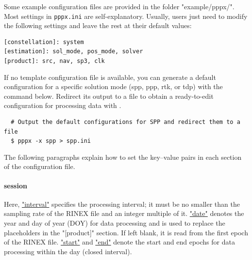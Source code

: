 Some example configuration files are provided in the folder "example/pppx/".
Most settings in \texttt{pppx.ini} are self-explanatory.
Usually, users just need to modify the following settings
and leave the rest at their default values:

\begin{verbatim}
[constellation]: system
[estimation]: sol_mode, pos_mode, solver
[product]: src, nav, sp3, clk
\end{verbatim}

If no template configuration file is available, you can generate a default configuration for a
specific solution mode (spp, ppp, rtk, or tdp) with the command below.
Redirect its output to a file to obtain a ready-to-edit configuration
for processing data with \pppx{}.

\begin{verbatim}
  # Output the default configurations for SPP and redirect them to a file
  $ pppx -x spp > spp.ini
\end{verbatim}






The following paragraphs explain how to set the key--value pairs in each section of the
configuration file.


\paragraph{session}

Here, \underline{"interval"} specifies the processing interval; it must be no smaller than the
sampling rate of the RINEX file and an integer multiple of it.
\underline{"date"} denotes the year and day of year (DOY) for data processing
and is used to replace the placeholders in the "[product]" section.
If left blank, it is read from the first epoch of the RINEX file.
\underline{"start"} and \underline{"end"} denote the start and end epochs for data processing
within the day (closed interval).

